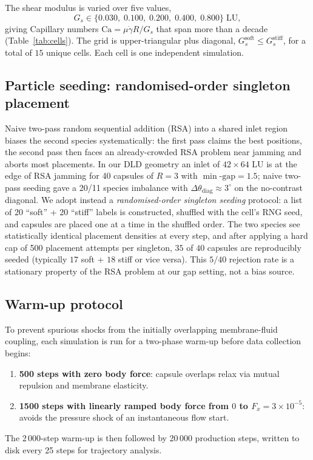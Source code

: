 \documentclass[11pt,a4paper]{article}
\begin{document}
The shear modulus is varied over five values,
\begin{equation}
  G_s \in \{0.030,\;0.100,\;0.200,\;0.400,\;0.800\}\;\text{LU},
  \label{eq:sweepvals}
\end{equation}
giving Capillary numbers
$\mathrm{Ca} = \mu \dot{\gamma} R / G_s$
that span more than a decade (Table~\ref{tab:cells}). The grid is
upper-triangular plus diagonal,
$G_s^{\text{soft}} \leq G_s^{\text{stiff}}$, for a total of $15$
unique cells. Each cell is one independent simulation.

\subsection{Particle seeding: randomised-order singleton placement}
\label{sec:methods-seeding}

Naive two-pass random sequential addition (RSA) into a shared inlet
region biases the second species systematically: the first pass
claims the best positions, the second pass then faces an
already-crowded RSA problem near jamming and aborts most placements.
In our DLD geometry an inlet of $42 \times 64$ LU is at the edge of
RSA jamming for 40 capsules of $R = 3$ with $\min\text{-gap} = 1.5$;
naive two-pass seeding gave a 20/11 species imbalance with
$\Delta\theta_{\text{diag}} \approx 3^\circ$ on the no-contrast
diagonal. We adopt instead a \emph{randomised-order singleton
seeding} protocol: a list of 20 ``soft'' + 20 ``stiff'' labels is
constructed, shuffled with the cell's RNG seed, and capsules are
placed one at a time in the shuffled order. The two species see
statistically identical placement densities at every step, and after
applying a hard cap of 500 placement attempts per singleton, $35$ of
$40$ capsules are reproducibly seeded (typically $17$ soft + $18$
stiff or vice versa). This $5/40$ rejection rate is a stationary
property of the RSA problem at our gap setting, not a bias source.

\subsection{Warm-up protocol}
\label{sec:methods-warmup}

To prevent spurious shocks from the initially overlapping
membrane-fluid coupling, each simulation is run for a two-phase
warm-up before data collection begins:
\begin{enumerate}
  \item \textbf{500 steps with zero body force}: capsule overlaps
        relax via mutual repulsion and membrane elasticity.
  \item \textbf{1500 steps with linearly ramped body force from
        $0$ to $F_x = 3\times 10^{-5}$}: avoids the
        pressure shock of an instantaneous flow start.
\end{enumerate}
The 2\,000-step warm-up is then followed by 20\,000 production
steps, written to disk every 25 steps for trajectory analysis.
\end{document}
